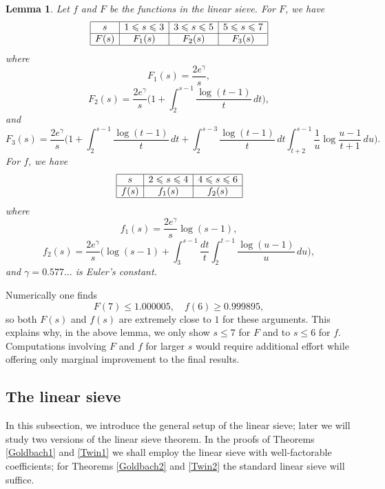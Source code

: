 \documentclass[12pt, a4paper]{amsart}
\def\leq{\leqslant}
\def\le{\leqslant}
\def\ge{\geqslant}
\theoremstyle{plain}
\newtheorem{lemma}[proposition]{Lemma}
\theoremstyle{remark}
\numberwithin{equation}{section}
\begin{document}
\begin{lemma}\label{Ff}
Let $f$ and $F$ be the functions in the linear sieve. 
For $F$, we have  
\renewcommand{\arraystretch}{2.4}
\medskip 
\[
\begin{array}{|c|c|c|c|c|}
\hline
s          & 1\le s\le 3 & 3\le s\le 5 & 5\le s\le 7  \\
\hline
F(s) & F_1(s) & F_2(s) & F_3(s) \\
\hline
\end{array}
\] 
where 
\[
F_1(s) = \frac{2e^{\gamma}}s, 
\]
\[
F_2(s)= \frac{2e^{\gamma}}s\bigg(1+\int_{2}^{s-1}\frac{\log(t-1)}t\,dt\bigg), 
\] 
and 
\[ 
F_3(s) = \frac{2e^{\gamma}}s\bigg(1+\int_{2}^{s-1}\frac{\log(t-1)}t\,dt
      +\int_{2}^{s-3}\frac{\log(t-1)}t\,dt\int_{t+2}^{s-1}
        \frac1u\log\frac{u-1}{t+1}\,du\bigg). 
\]
For $f$, we have  
\renewcommand{\arraystretch}{2.4}
\medskip 
\[
\begin{array}{|c|c|c|c|c|}
\hline
s          & 2\le s\le 4 & 4\le s\le 6 \\
\hline
f(s) & f_1(s) & f_2(s) \\
\hline
\end{array}
\]
where 
\[
f_1(s) = \frac{2e^{\gamma}}s\log(s-1), 
\]
\[
f_2(s)= \frac{2e^{\gamma}}s\bigg(\log(s-1)+\int_{3}^{s-1}\frac{dt}t\int_{2}^{t-1} \frac{\log(u-1)}u\,du\bigg), 
\]
and $\gamma=0.577\ldots$ is Euler’s constant.
\end{lemma}

Numerically one finds
\[
F(7)\le 1.000005,\quad f(6)\ge 0.999895,
\]
so both $F(s)$ and $f(s)$ are extremely close to $1$ for these arguments.  
This explains why, in the above lemma, we only show $s \leq 7$ for $F$ and to $s \leq 6$ for $f$. 
Computations involving $F$ and $f$ for larger $s$ would require additional effort while offering only marginal 
improvement to the final results. 

\subsection{The linear sieve}
In this subsection, we introduce the general setup of the linear sieve; later we will study two versions of the linear sieve theorem. In the proofs of Theorems \ref{Goldbach1} and \ref{Twin1} we shall employ the linear sieve with well-factorable coefficients; for Theorems \ref{Goldbach2} and \ref{Twin2} the standard linear sieve will suffice.
\end{document}
